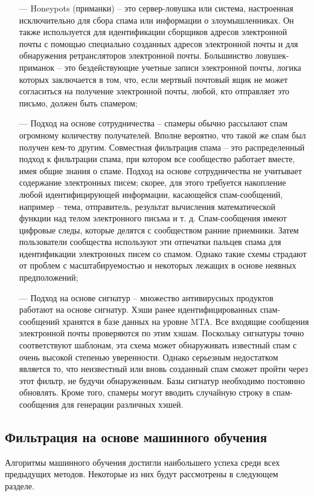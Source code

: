 \begin{itemize}
    \item[—] Honeypots (приманки) -- это сервер-ловушка или система, настроенная исключительно для сбора спама или
        информации о злоумышленниках. Он также используется для идентификации сборщиков адресов электронной
        почты с помощью специально созданных адресов электронной почты и для обнаружения ретрансляторов
        электронной почты. Большинство ловушек-приманок -- это бездействующие учетные записи электронной почты,
        логика которых заключается в том, что, если мертвый почтовый ящик не может согласиться на получение
        электронной почты, любой, кто отправляет это письмо, должен быть спамером;
    \item[—] Подход на основе сотрудничества -- спамеры обычно рассылают спам огромному количеству получателей. Вполне вероятно, что такой же спам
        был получен кем-то другим. Совместная фильтрация спама -- это распределенный подход к фильтрации спама,
        при котором все сообщество работает вместе, имея общие знания о спаме. Подход на основе сотрудничества
        не учитывает содержание электронных писем; скорее, для этого требуется накопление любой идентифицирующей
        информации, касающейся спам-сообщений, например -- тема, отправитель, результат вычисления математической
        функции над телом электронного письма и т. д. Спам-сообщения имеют цифровые следы, которые делятся с
        сообществом ранние приемники. Затем пользователи сообщества используют эти отпечатки пальцев спама для
        идентификации электронных писем со спамом. Однако такие схемы страдают от проблем с
        масштабируемостью и некоторых лежащих в основе неявных предположений;
    \item[—] Подход на основе сигнатур -- множество антивирусных продуктов работают на основе сигнатур. Хэши ранее
        идентифицированных спам-сообщений хранятся в базе данных на уровне MTA. Все входящие сообщения
        электронной почты проверяются по этим хэшам. Поскольку сигнатуры точно соответствуют шаблонам,
        эта схема может обнаруживать известный спам с очень высокой степенью уверенности.
        Однако серьезным недостатком является то, что неизвестный или вновь созданный спам сможет
        пройти через этот фильтр, не будучи обнаруженным. Базы сигнатур необходимо постоянно обновлять.
        Кроме того, спамеры могут вводить случайную строку в спам-сообщения для генерации различных хэшей.
\end{itemize}

\subsection{Фильтрация на основе машинного обучения}
Алгоритмы машинного обучения достигли наибольшего успеха среди
всех предыдущих методов. Некоторые из них будут рассмотрены в следующем разделе.
